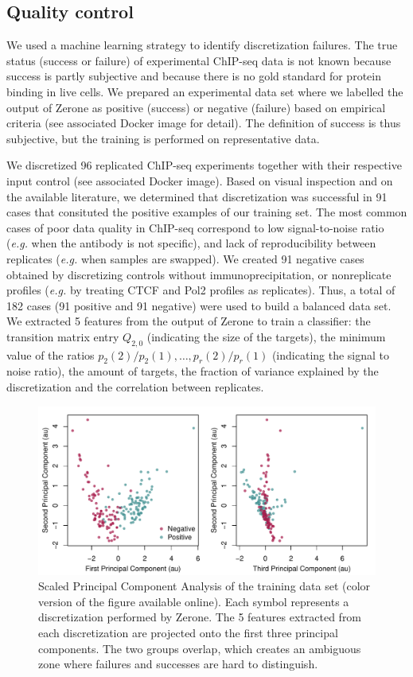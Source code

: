 \documentclass{bioinfo}
\begin{document}
\begin{methods}
\subsection{Quality control}
\label{sub:training}
We used a machine learning strategy to identify discretization
failures. The true status (success or failure) of experimental ChIP-seq
data is not known because success is partly subjective and because
there is no gold standard for protein binding in live cells.
We prepared an experimental data set where we labelled the
output of Zerone as positive (success) or negative (failure) based
on empirical criteria (see associated Docker image for detail).
The definition of success is thus subjective, but the training is
performed on representative data.

We discretized 96 replicated ChIP-seq experiments together with their
respective input control (see associated Docker image). Based on
visual inspection and on the available literature, we determined
that discretization was successful in 91 cases that consituted the
positive examples of our training set. The most common cases of
poor data quality in ChIP-seq correspond to low signal-to-noise ratio
(\textit{e.g.} when the antibody is not specific), and lack of
reproducibility between replicates (\textit{e.g.} when samples are
swapped). We created 91 negative cases obtained by discretizing
controls without immunoprecipitation, or
nonreplicate profiles (\textit{e.g.} by treating CTCF and Pol2 profiles
as replicates). Thus, a total of 182 cases (91 positive and 91
negative) were used to build a balanced data set. We extracted 5
features from the output of Zerone to train a classifier:
the transition matrix entry $Q_{2,0}$ (indicating the size of the
targets), the minimum value of the ratios
$p_2(2)/p_2(1), \ldots, p_r(2)/p_r(1)$ (indicating the
signal to noise ratio), the amount of targets, the fraction of
variance explained by the discretization and the correlation between
replicates.


\begin{figure}[!tpb]
\centerline{\includegraphics[scale=0.45]{PCA.pdf}}
\caption{
  Scaled Principal Component Analysis of the training data set
  (color version of the figure available online).
  Each symbol represents a discretization performed by Zerone. The
  5 features extracted from each discretization are projected onto
  the first three principal components. The two groups overlap,
  which creates an ambiguous zone where failures and successes are
  hard to distinguish.
}\label{fig:pca}
\end{figure}



\end{methods}
\end{document}

